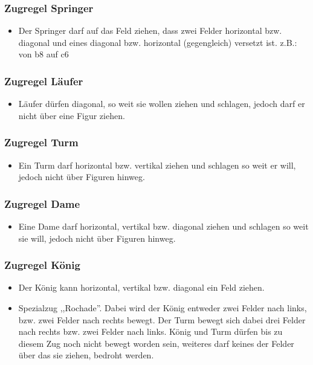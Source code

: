 \documentclass[12pt,a4paper]{article}
\begin{document}
\subsubsection{Zugregel Springer}
\label{SUBSUBSEC:JUMPER}
\begin{itemize}
	\item{Der Springer darf auf das Feld ziehen, dass zwei Felder horizontal bzw. diagonal und eines diagonal bzw. horizontal (gegengleich) versetzt ist. z.B.: von  b8 auf c6}
\end{itemize}
\subsubsection{Zugregel Läufer}
\label{SUBSUBSEC:BISHOP}
\begin{itemize}
	\item{Läufer dürfen diagonal, so weit sie wollen ziehen und schlagen, jedoch darf er nicht über eine Figur ziehen.}
\end{itemize}

\subsubsection{Zugregel Turm}
\label{SUBSUBSEC:ROOK}
\begin{itemize}
	\item{Ein Turm darf horizontal bzw. vertikal ziehen und schlagen so weit er will, jedoch nicht über Figuren hinweg.}
\end{itemize}

\subsubsection{Zugregel Dame}
\label{SUBSUBSEC:QUEEN}
\begin{itemize}
	\item{Eine Dame darf horizontal, vertikal bzw. diagonal ziehen und schlagen so weit sie will, jedoch nicht über Figuren hinweg.}
\end{itemize}

\subsubsection{Zugregel König}
\label{SUBSUBSEC:KING}
\begin{itemize}
	\item{Der König kann horizontal, vertikal bzw. diagonal ein Feld ziehen.}
	\item{Spezialzug ,,Rochade''. Dabei wird der König entweder zwei Felder nach links, bzw. zwei Felder nach rechts bewegt. Der Turm bewegt sich dabei drei Felder nach rechts bzw. zwei Felder nach links. König und Turm dürfen bis zu diesem Zug noch nicht bewegt worden sein, weiteres darf keines der Felder über das sie ziehen, bedroht werden.}
\end{itemize}
\end{document}
